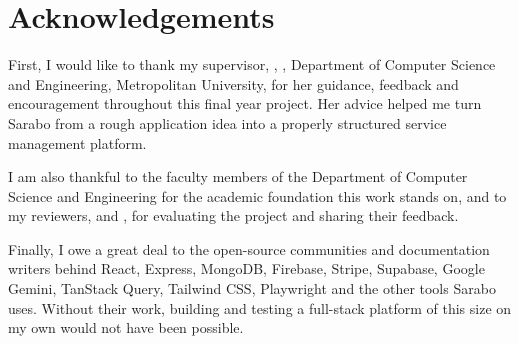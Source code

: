 \documentclass{standalone}
\begin{document}
\chapter*{Acknowledgements}
First, I would like to thank my supervisor, \textbf{\supervisorname}, \supervisordesig, Department of Computer Science and Engineering, Metropolitan University, for her guidance, feedback and encouragement throughout this final year project. Her advice helped me turn Sarabo from a rough application idea into a properly structured service management platform.

I am also thankful to the faculty members of the Department of Computer Science and Engineering for the academic foundation this work stands on, and to my reviewers, \textbf{\reviewerone} and \textbf{\reviewertwo}, for evaluating the project and sharing their feedback.

Finally, I owe a great deal to the open-source communities and documentation writers behind React, Express, MongoDB, Firebase, Stripe, Supabase, Google Gemini, TanStack Query, Tailwind CSS, Playwright and the other tools Sarabo uses. Without their work, building and testing a full-stack platform of this size on my own would not have been possible.
\end{document}
